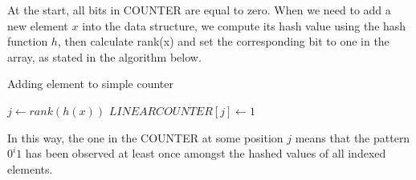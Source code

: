 \documentclass[a4paper,13pt]{article}
\theoremstyle{mytheor}
\begin{document}
At the start, all bits in COUNTER are equal to zero. When we need to
add a new element $x$ into the data structure, we compute its hash value
using the hash function $h$, then calculate rank(x) and set
the corresponding bit to one in the array, as stated in the algorithm
below.\\
\begin{algorithm}[H]
    \DontPrintSemicolon
    \LinesNumberedHidden
    \caption[]{Adding element to simple counter}
    $j \gets rank(h(x))$\;
    {
        $LINEARCOUNTER[j]\gets 1$
    }
\end{algorithm}
\vspace{0.4cm}
In this way, the one in the COUNTER at some position $j$ means that
the pattern $0^i 1$ has been observed at least once amongst the hashed
values of all indexed elements.
\end{document}

